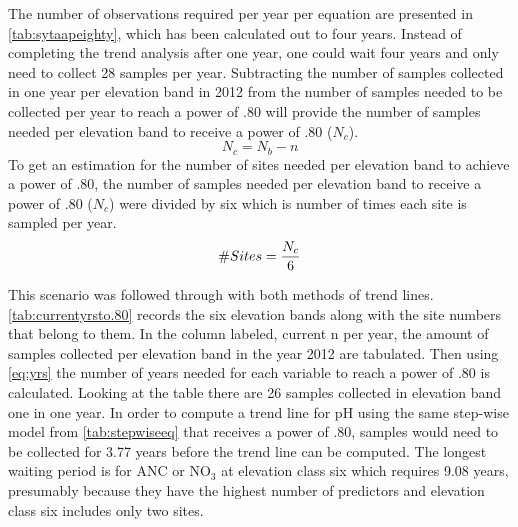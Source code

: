 The number of observations required per year per equation are presented in \autoref{tab:sytaapeighty}, which has been calculated out to four years.
Instead of completing the trend analysis after one year, one could wait four years and only need to collect 28 samples per year.
Subtracting the number of samples collected in one year per elevation band in 2012 from the number of samples needed to be collected per year to reach a power of .80 will provide the number of samples needed per elevation band to receive a power of .80 ($N_c$).
\begin{equation} \label{eq:Nc}
    N_c={N_b - n}
\end{equation}
To get an estimation for the number of sites needed per elevation band to achieve a power of .80, the number of samples needed per elevation band to receive a power of .80 ($N_c$) were divided by six which is number of times each site is sampled per year.
\begin{equation}\label{eq:sites}
    \#Sites = {N_c \over 6}
\end{equation}


This scenario was followed through with both methods of trend lines.
\autoref{tab:currentyrsto.80} records the six elevation bands along with the site numbers that belong to them. 
 In the column labeled, current n per year, the amount of samples collected per elevation band in the year 2012 are tabulated.  
 Then using \autoref{eq:yrs} the number of years needed for each variable to reach a power of .80 is calculated.
Looking at the table there are 26  samples collected in elevation band one in one year.  
In order to compute a trend line for pH using the same step-wise model from \autoref{tab:stepwiseeq} that receives a power of .80,  samples would need to be collected for 3.77 years before the trend line can be computed.   
The longest waiting period is for ANC or NO$_3$ at elevation class six which requires 9.08 years, presumably because they have the highest number of predictors and elevation class six includes only two sites. 




